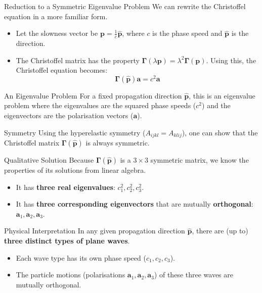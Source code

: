 \documentclass{beamer}
\begin{document}
\begin{frame}{Reduction to a Symmetric Eigenvalue Problem}
    We can rewrite the Christoffel equation in a more familiar form.
    \begin{itemize}
        \item Let the slowness vector be $\mathbf{p} = \frac{1}{c}\hat{\mathbf{p}}$, where $c$ is the phase speed and $\hat{\mathbf{p}}$ is the direction.
        \pause
        \item The Christoffel matrix has the property $\mathbf{\Gamma}(\lambda \mathbf{p}) = \lambda^2 \mathbf{\Gamma}(\mathbf{p})$. Using this, the Christoffel equation becomes:
        $$ \mathbf{\Gamma}(\hat{\mathbf{p}})\mathbf{a} = c^2 \mathbf{a} $$
    \end{itemize}
    \pause
    \begin{alertblock}{An Eigenvalue Problem}
        For a fixed propagation direction $\hat{\mathbf{p}}$, this is an eigenvalue problem where the eigenvalues are the squared phase speeds ($c^2$) and the eigenvectors are the polarisation vectors ($\mathbf{a}$).
    \end{alertblock}
    \pause
    \begin{block}{Symmetry}
        Using the hyperelastic symmetry ($A_{ijkl}=A_{klij}$), one can show that the Christoffel matrix $\mathbf{\Gamma}(\hat{\mathbf{p}})$ is always symmetric.
    \end{block}
\end{frame}

\begin{frame}{Qualitative Solution}
    Because $\mathbf{\Gamma}(\hat{\mathbf{p}})$ is a $3 \times 3$ symmetric matrix, we know the properties of its solutions from linear algebra.
    \begin{itemize}
        \item It has \textbf{three real eigenvalues}: $c_1^2, c_2^2, c_3^2$.
        \pause
        \item It has \textbf{three corresponding eigenvectors} that are mutually \textbf{orthogonal}: $\mathbf{a}_1, \mathbf{a}_2, \mathbf{a}_3$.
    \end{itemize}
    \pause
    \begin{alertblock}{Physical Interpretation}
        In any given propagation direction $\hat{\mathbf{p}}$, there are (up to) \textbf{three distinct types of plane waves}.
        \begin{itemize}
            \item Each wave type has its own phase speed ($c_1, c_2, c_3$).
            \item The particle motions (polarisations $\mathbf{a}_1, \mathbf{a}_2, \mathbf{a}_3$) of these three waves are mutually orthogonal.
        \end{itemize}
    \end{alertblock}
\end{frame}
\end{document}
